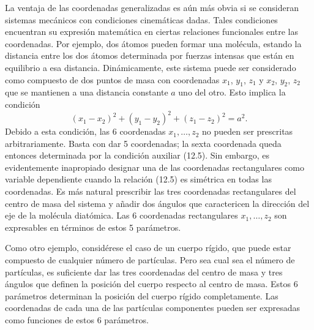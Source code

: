 \documentclass[12pt,a4paper]{book}
\begin{document}
La ventaja de las coordenadas generalizadas es a\'un m\'as obvia si se consideran sistemas mec\'anicos con condiciones cinem\'aticas dadas. Tales condiciones encuentran su expresi\'on matem\'atica en ciertas relaciones funcionales entre las coordenadas. Por ejemplo, dos \'atomos pueden formar una mol\'ecula, estando la distancia entre los dos \'atomos determinada por fuerzas intensas que est\'an en equilibrio a esa distancia. Din\'amicamente, este sistema puede ser considerado como compuesto de dos puntos de masa con coordenadas $x_1$, $y_1$, $z_1$ y $x_2$, $y_2$, $z_2$ que se mantienen a una distancia constante $a$ uno del otro. Esto implica la condici\'on
\begin{equation}
(x_1 - x_2)^2 + (y_1 - y_2)^2 + (z_1 - z_2)^2 = a^2.
\tag{12.5}
\end{equation}
Debido a esta condici\'on, las 6 coordenadas $x_1, \ldots, z_2$ no pueden ser prescritas arbitrariamente. Basta con dar 5 coordenadas; la sexta coordenada queda entonces determinada por la condici\'on auxiliar (12.5). Sin embargo, es evidentemente inapropiado designar una de las coordenadas rectangulares como variable dependiente cuando la relaci\'on (12.5) es sim\'etrica en todas las coordenadas. Es m\'as natural prescribir las tres coordenadas rectangulares del centro de masa del sistema y a\~nadir dos \'angulos que caractericen la direcci\'on del eje de la mol\'ecula diat\'omica. Las 6 coordenadas rectangulares $x_1, \ldots, z_2$ son expresables en t\'erminos de estos 5 par\'ametros.

Como otro ejemplo, consid\'erese el caso de un cuerpo r\'igido, que puede estar compuesto de cualquier n\'umero de part\'iculas. Pero sea cual sea el n\'umero de part\'iculas, es suficiente dar las tres coordenadas del centro de masa y tres \'angulos que definen la posici\'on del cuerpo respecto al centro de masa. Estos 6 par\'ametros determinan la posici\'on del cuerpo r\'igido completamente. Las coordenadas de cada una de las part\'iculas componentes pueden ser expresadas como funciones de estos 6 par\'ametros.
\end{document}
